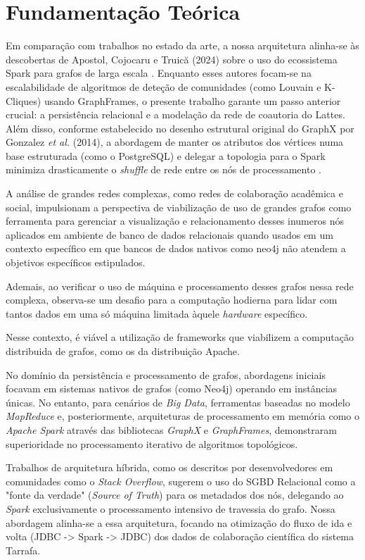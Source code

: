 \chapter{Fundamentação Teórica}
\label{cap:trabalhos_relacionados}

Em comparação com trabalhos no estado da arte, a nossa arquitetura alinha-se às descobertas de Apostol, Cojocaru e Truică (2024) sobre o uso do ecossistema Spark para grafos de larga escala \cite{apostol2024largescale}. Enquanto esses autores focam-se na escalabilidade de algoritmos de deteção de comunidades (como Louvain e K-Cliques) usando GraphFrames, o presente trabalho garante um passo anterior crucial: a persistência relacional e a modelação da rede de coautoria do Lattes. Além disso, conforme estabelecido no desenho estrutural original do GraphX por Gonzalez \textit{et al.} (2014), a abordagem de manter os atributos dos vértices numa base estruturada (como o PostgreSQL) e delegar a topologia para o Spark minimiza drasticamente o \textit{shuffle} de rede entre os nós de processamento \cite{gonzalez2014graphx}.

A análise de grandes redes complexas, como redes de colaboração acadêmica e social, impulsionam a perspectiva de viabilização de uso de grandes grafos como ferramenta para gerenciar a visualização e relacionamento desses inumeros nós aplicados em ambiente de banco de dados relacionais quando usados em um contexto específico em que bancos de dados nativos como neo4j não atendem a objetivos específicos estipulados.

Ademais, ao verificar o uso de máquina e processamento desses grafos nessa rede complexa, observa-se um desafio para a computação hodierna para lidar com tantos dados em uma só máquina limitada àquele \textit{hardware} específico.

Nesse contexto, é viável a utilização de frameworks que viabilizem a computação distribuida de grafos, como os da distribuição Apache.

No domínio da persistência e processamento de grafos, abordagens iniciais focavam em sistemas nativos de grafos (como Neo4j) operando em instâncias únicas. No entanto, para cenários de \textit{Big Data}, ferramentas baseadas no modelo \textit{MapReduce} e, posteriormente, arquiteturas de processamento em memória como o \textit{Apache Spark} através das bibliotecas \textit{GraphX} e \textit{GraphFrames}, demonstraram superioridade no processamento iterativo de algoritmos topológicos.

Trabalhos de arquitetura híbrida, como os descritos por desenvolvedores em comunidades como o \textit{Stack Overflow}, sugerem o uso do SGBD Relacional como a "fonte da verdade" (\textit{Source of Truth}) para os metadados dos nós, delegando ao \textit{Spark} exclusivamente o processamento intensivo de travessia do grafo. Nossa abordagem alinha-se a essa arquitetura, focando na otimização do fluxo de ida e volta (JDBC -> Spark -> JDBC) dos dados de colaboração científica do sistema Tarrafa.

